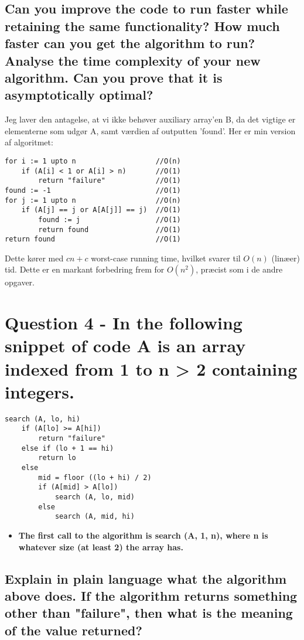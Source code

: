 \documentclass[a4paper,12pt]{article}
\begin{document}
\subsection[]{Can you improve the code to run faster while retaining the same functionality? How
much faster can you get the algorithm to run? Analyse the time complexity of your new
algorithm. Can you prove that it is asymptotically optimal?}

Jeg laver den antagelse, at vi ikke behøver auxiliary array'en B, da det vigtige er elementerne som udgør A, samt værdien af outputten 'found'.
Her er min version af algoritmet:
\begin{lstlisting}
for i := 1 upto n                   //O(n)
    if (A[i] < 1 or A[i] > n)       //O(1)
        return "failure"            //O(1)
found := -1                         //O(1)
for j := 1 upto n                   //O(n)
    if (A[j] == j or A[A[j]] == j)  //O(1)
        found := j                  //O(1)
        return found                //O(1)
return found                        //O(1)
\end{lstlisting}
Dette kører med $cn + c$ worst-case running time, hvilket svarer til $O(n)$ (linæer) tid. Dette er en markant forbedring frem for $O(n^2)$, præcist som i de andre opgaver.

\section[Question 4]{Question 4 - In the following snippet of code A is an array indexed from 1 to n > 2 containing integers.}

\begin{lstlisting}
search (A, lo, hi)
    if (A[lo] >= A[hi])
        return "failure"
    else if (lo + 1 == hi)
        return lo
    else 
        mid = floor ((lo + hi) / 2)
        if (A[mid] > A[lo])
            search (A, lo, mid)
        else
            search (A, mid, hi)
\end{lstlisting}

\begin{itemize}
    \item[] \textbf{The first call to the algorithm is search (A, 1, n), where n is whatever size (at least 2) the
    array has.}
\end{itemize}

\subsection[]{Explain in plain language what the algorithm above does. If the algorithm returns something other than "failure", then what is the meaning of the value returned?}
    
\end{document}
